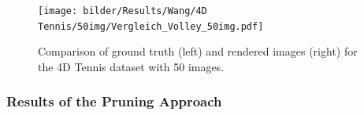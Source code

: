     


        





\begin{figure}[h]
    \centering
    \texttt{[image: bilder/Results/Wang/4D Tennis/50img/Vergleich\_Volley\_50img.pdf]}
    \caption{Comparison of ground truth (left) and rendered images (right) for the 4D Tennis dataset with 50 images.}
    \label{fig:DyNeRFVergleich}
\end{figure}


\FloatBarrier





\subsubsection{Results of the Pruning Approach}
\label{pruning_results}

